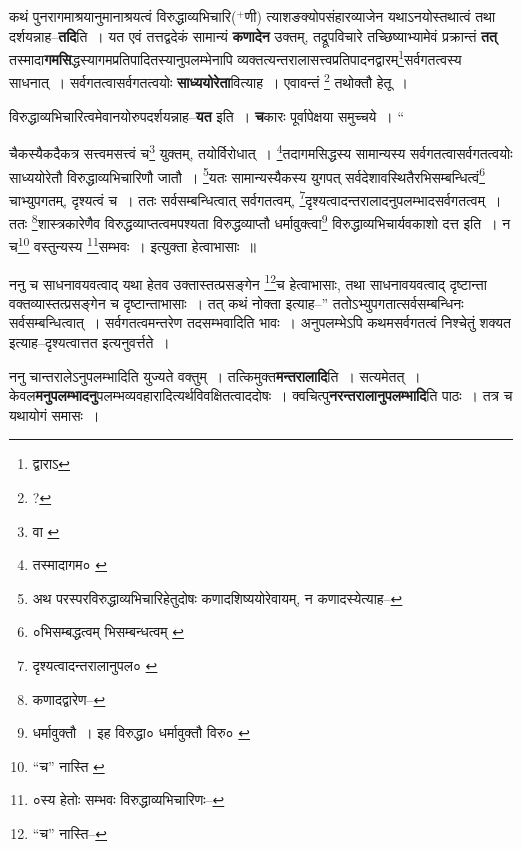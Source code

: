 \documentclass[article,12pt,a4paper]{memoir}
\newcommand{\add}[1]{($^{+}$#1)}
\begin{document}
	  \pstart कथं पुनरागमाश्रयानुमानाश्रयत्वं विरुद्धाव्यभिचारि\add{णी} त्याशङक्योपसंहारव्याजेन यथाऽनयोस्तथात्वं तथा दर्शयन्नाह--\textbf{तदि}ति । यत एवं तत्तद्वदेकं सामान्यं \textbf{कणादेन} उक्तम्, तद्रूपविचारे तच्छिष्याभ्यामेवं प्रक्रान्तं \textbf{तत्} तस्मादा\textbf{गमसि}द्धस्यागमप्रतिपादितस्यानुपलम्भेनापि व्यक्तत्यन्तरालासत्त्वप्रतिपादनद्वारम्\footnote{द्वाराऽ}\-सर्वगतत्वस्य साधनात् । सर्वगतत्वासर्वगतत्वयोः \textbf{साध्ययोरेता}वित्याह । एवावन्तं \footnote{?} तथोक्तौ हेतू ।
	\pend
      

	  \pstart विरुद्धाव्यभिचारित्वमेवानयोरुपदर्शयन्नाह--\textbf{यत} इति । \textbf{च}कारः पूर्वापेक्षया समुच्चये ।  \leavevmode{} “
	  
	चैकस्यैकदैकत्र सत्त्वमसत्त्वं च\footnote{वा \cite{dp-msD}} युक्तम्, तयोर्विरोधात् । \footnote{तस्मादागम० \cite{dp-msB}}\-तदागमसिद्धस्य सामान्यस्य सर्वगतत्वासर्वगतत्वयोः साध्ययोरेतौ विरुद्धाव्यभिचारिणौ जातौ । \footnote{अथ परस्परविरुद्धाव्यभिचारिहेतुदोषः कणादशिष्ययोरेवायम्, न कणादस्येत्याह--\cite{dp-msD-n}}\-यतः सामान्यस्यैकस्य युगपत् सर्वदेशावस्थितैरभिसम्बन्धित्वं\footnote{०भिसम्बद्धत्वम् \cite{dp-msB} भिसम्बन्धत्वम् \cite{dp-msD}} चाभ्युपगतम्, दृश्यत्वं च । ततः सर्वसम्बन्धित्वात् सर्वगतत्वम्, \footnote{दृश्यत्वादन्तरालानुपल० \cite{dp-msA} \cite{dp-msB} \cite{dp-msC} \cite{dp-msD} \cite{dp-edP} \cite{dp-edH} \cite{dp-edE} \cite{dp-edN}}\-दृश्यत्वादन्तरालादनुपलम्भादसर्वगतत्वम् । ततः \footnote{कणादद्वारेण--\cite{dp-msD-n}}\-शास्त्रकारेणैव विरुद्धव्याप्तत्वमपश्यता विरुद्धव्याप्तौ धर्मावुक्त्वा\footnote{धर्मावुक्तौ । इह विरुद्धा० \cite{dp-msB} धर्मावुक्तौ विरु० \cite{dp-msC} \cite{dp-msD}} विरुद्धाव्यभिचार्यवकाशो दत्त इति । न च\footnote{“च” नास्ति \cite{dp-msB} \cite{dp-msD}} वस्तुन्यस्य \footnote{०स्य हेतोः सम्भवः \cite{dp-msB} \cite{dp-msD} विरुद्धाव्यभिचारिणः--\cite{dp-msD-n}}\-सम्भवः । इत्युक्ता हेत्वाभासाः ॥ 
	  
	ननु च साधनावयवत्वाद् यथा हेतव उक्तास्तत्प्रसङ्गेन \footnote{“च” नास्ति--\cite{dp-msD}}\-च हेत्वाभासाः, तथा साधनावयवत्वाद् दृष्टान्ता वक्तव्यास्तत्प्रसङ्गेन च दृष्टान्ताभासाः । तत् कथं नोक्ता इत्याह--” ततोऽभ्युपगतात्सर्वसम्बन्धिनः सर्वसम्बन्धित्वात् । सर्वगतत्वमन्तरेण तदसम्भवादिति भावः । अनुपलम्भेऽपि कथमसर्वगतत्वं निश्चेतुं शक्यत इत्याह--दृश्यत्वात्तत इत्यनुवर्त्तते ।
	\pend
      

	  \pstart ननु चान्तरालेऽनुपलम्भादिति युज्यते वक्तुम् । तत्किमुक्त\textbf{मन्तरालादि}ति । सत्यमेतत् । केवल\textbf{मनुपलम्भादनु}पलम्भव्यवहारादित्यर्थविवक्षितत्वाददोषः । क्वचित्पु\textbf{नरन्तरालानुपलम्भादि}ति पाठः । तत्र च यथायोगं समासः ।
	\pend
      
\end{document}
